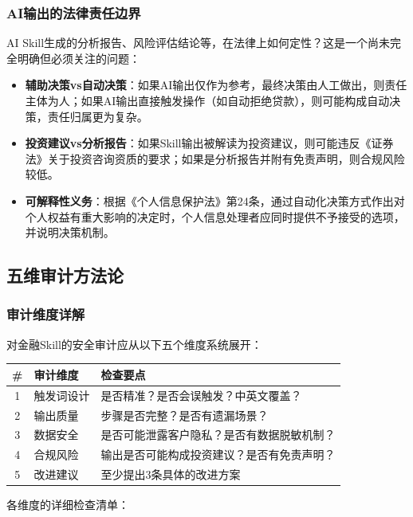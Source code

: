\subsubsection{AI输出的法律责任边界}

AI Skill生成的分析报告、风险评估结论等，在法律上如何定性？这是一个尚未完全明确但必须关注的问题：

\begin{itemize}[leftmargin=2em]
  \item \textbf{辅助决策vs自动决策}：如果AI输出仅作为参考，最终决策由人工做出，则责任主体为人；如果AI输出直接触发操作（如自动拒绝贷款），则可能构成自动决策，责任归属更为复杂。
  \item \textbf{投资建议vs分析报告}：如果Skill输出被解读为投资建议，则可能违反《证券法》关于投资咨询资质的要求；如果是分析报告并附有免责声明，则合规风险较低。
  \item \textbf{可解释性义务}：根据《个人信息保护法》第24条，通过自动化决策方式作出对个人权益有重大影响的决定时，个人信息处理者应同时提供不予接受的选项，并说明决策机制。
\end{itemize}

\subsection{五维审计方法论}

\subsubsection{审计维度详解}

对金融Skill的安全审计应从以下五个维度系统展开：

\begin{table}[H]
\centering
\begin{tabular}{clp{6.5cm}}
\toprule
\textbf{\#} & \textbf{审计维度} & \textbf{检查要点} \\
\midrule
1 & 触发词设计 & 是否精准？是否会误触发？中英文覆盖？ \\
2 & 输出质量 & 步骤是否完整？是否有遗漏场景？ \\
3 & 数据安全 & 是否可能泄露客户隐私？是否有数据脱敏机制？ \\
4 & 合规风险 & 输出是否可能构成投资建议？是否有免责声明？ \\
5 & 改进建议 & 至少提出3条具体的改进方案 \\
\bottomrule
\end{tabular}
\end{table}

各维度的详细检查清单：


